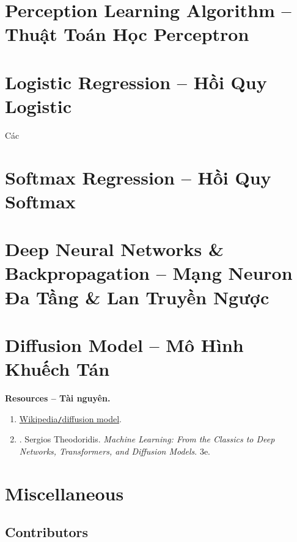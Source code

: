 \documentclass{article}
\begin{document}

\section{Perception Learning Algorithm -- Thuật Toán Học Perceptron}


\section{Logistic Regression -- Hồi Quy Logistic}

 Các
\section{Softmax Regression -- Hồi Quy Softmax}


\section{Deep Neural Networks \& Backpropagation -- Mạng Neuron Đa Tầng \& Lan Truyền Ngược}


\section{Diffusion Model -- Mô Hình Khuếch Tán}
\textbf{\textsf{Resources -- Tài nguyên.}} 
\begin{enumerate}
	\item \href{https://en.wikipedia.org/wiki/Diffusion_model}{Wikipedia{\tt/}diffusion model}.
	\item \cite{Theodoridis2025}. {\sc Sergios Theodoridis}. {\it Machine Learning: From the Classics to Deep Networks, Transformers, and Diffusion Models}. 3e.
\end{enumerate}


\section{Miscellaneous}

\subsection{Contributors}


\printbibliography[heading=bibintoc]
	
\end{document}
